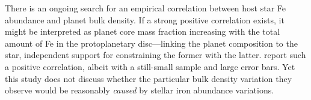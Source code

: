 
There is an ongoing search for an empirical correlation between host star Fe abundance and planet bulk density. If a strong positive correlation exists, it might be interpreted as  planet core mass fraction increasing with the total amount of Fe in the protoplanetary disc---linking the planet composition to the star, independent support for constraining the former with the latter. %
\citet{adibekyan_compositional_2021} report such a positive correlation, albeit with a still-small sample and large error bars. Yet this study does not discuss whether the particular bulk density variation they observe would be reasonably \textit{caused} by stellar iron abundance variations.



